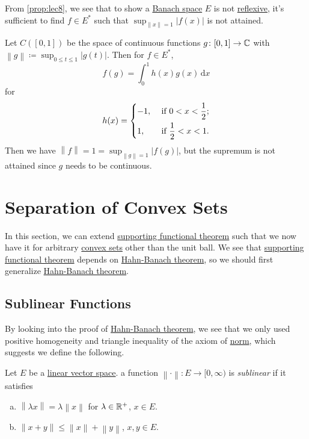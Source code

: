 From \autoref{prop:lec8}, we see that to show a \hyperref[def:Banach-space]{Banach space} \(E\) is not \hyperref[def:reflexive-space]{reflexive}, it's sufficient to find \(f\in E^{\ast} \) such that \(\sup _{\left\lVert x\right\rVert = 1}\left\vert f(x) \right\vert \) is not attained.

\begin{eg}
	Let \(C([0, 1])\) be the space of continuous functions \(g\colon [0, 1]\to \mathbb{\MakeUppercase{c}}\) with \(\left\lVert g\right\rVert \coloneqq \sup _{0 \leq t\leq 1} \left\vert g(t) \right\vert \). Then for \(f\in E^{\ast} \),
	\[
		f(g) = \int _0 ^1 h(x)g(x)\,\mathrm{d} x
	\]
	for
	\[
		h(x) = \begin{dcases}
			-1, & \text{ if } 0 < x < \frac{1}{2}; \\
			1,  & \text{ if } \frac{1}{2} < x < 1.
		\end{dcases}
	\]
	Then we have \(\left\lVert f\right\rVert = 1 = \sup _{\left\lVert g\right\rVert = 1}\left\vert f(g) \right\vert \), but the supremum is not attained since \(g\) needs to be continuous.
\end{eg}

\section{Separation of Convex Sets}
In this section, we can extend \hyperref[thm:supporting-functional]{supporting functional theorem} such that we now have it for arbitrary \hyperref[def:convex-set]{convex sets} other than the unit ball. We see that \hyperref[thm:supporting-functional]{supporting functional theorem} depends on \hyperref[thm:Hahn-Banach]{Hahn-Banach theorem}, so we should first generalize \hyperref[thm:Hahn-Banach]{Hahn-Banach theorem}.
\subsection{Sublinear Functions}
By looking into the proof of \hyperref[thm:Hahn-Banach]{Hahn-Banach theorem}, we see that we only used positive homogeneity and triangle inequality of the axiom of \hyperref[def:norm]{norm}, which suggests we define the following.

\begin{definition}[Sublinear]\label{def:sublinear}
	Let \(E\) be a \hyperref[def:linear-vector-space]{linear vector space}. a function \(\left\lVert \cdot\right\rVert \colon E \to [0, \infty )\) is \emph{sublinear} if it satisfies
	\begin{enumerate}[(a)]
		\item \(\left\lVert \lambda x\right\rVert = \lambda \left\lVert x\right\rVert \) for \(\lambda \in \mathbb{\MakeUppercase{r}}^+ \), \(x\in E\).
		\item \(\left\lVert x + y\right\rVert \leq \left\lVert x\right\rVert + \left\lVert y\right\rVert\), \(x, y\in E\).
	\end{enumerate}
\end{definition}

